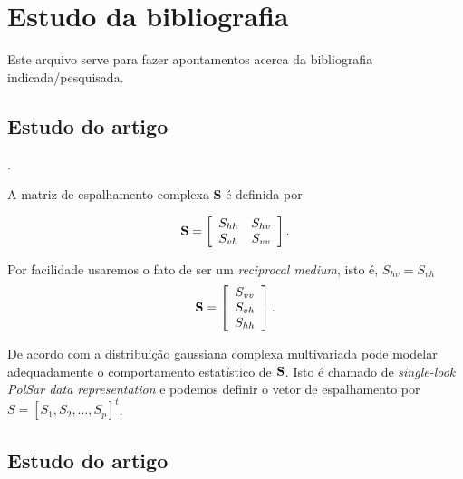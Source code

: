 \documentclass[10pt,a4paper]{article}
\begin{document}
\nocite{lee94}

\section{Estudo da bibliografia}

Este arquivo serve para fazer apontamentos acerca da bibliografia indicada/pesquisada.

\subsection{Estudo do artigo  \cite{lee94}}.

A matriz de espalhamento complexa {\bf S} é definida por

$$
{\bf S} = \left[
\begin{array}{cc}
	S_{hh}   & S_{hv}   \\
	S_{vh}   & S_{vv}   \\
\end{array}
\right].
$$

Por facilidade usaremos o fato de ser um {\it reciprocal medium}, isto é, $S_{hv}=S_{vh}$
$$
{\bf S} = \left[
\begin{array}{c}
	S_{vv}      \\
	S_{vh}     \\
	S_{hh}      \\
\end{array}
\right].
$$

De acordo com \cite{goodman1963} a distribuíção gaussiana complexa multivariada pode modelar adequadamente o comportamento estatístico de $\bf S$. Isto é chamado de {\it single-look PolSar data representation} e podemos definir o vetor de espalhamento por $S=[S_1,S_2,\dots,S_p]^t$. 



\subsection{Estudo do artigo  \cite{goodman1963}}






 
\end{document}
